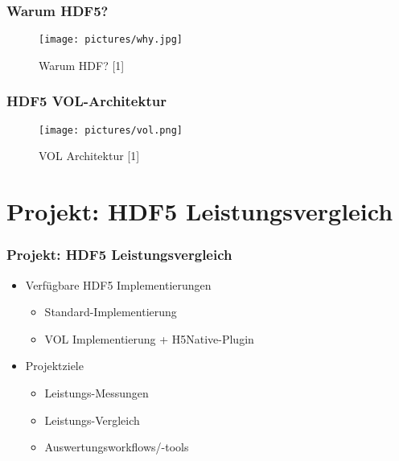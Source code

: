 \begin{frame}
	\frametitle{Warum HDF5?}
	\begin{figure}
		\centering
		\texttt{[image: pictures/why.jpg]}
		\caption*{Warum HDF? [1]}
	\end{figure}
\end{frame}


\begin{frame}
	\frametitle{HDF5 VOL-Architektur}
	\begin{figure}
		\centering
		\texttt{[image: pictures/vol.png]}
		\caption*{VOL Architektur [1]}
	\end{figure}
\end{frame}




\section{Projekt: HDF5 Leistungsvergleich}
\begin{frame}
	\frametitle{Projekt: HDF5 Leistungsvergleich}
	\begin{itemize}
		\item Verfügbare HDF5 Implementierungen
			\begin{itemize}
				\item Standard-Implementierung
				\item VOL Implementierung + H5Native-Plugin
			\end{itemize}
	\end{itemize}

	\begin{itemize}
		\item Projektziele
			\begin{itemize}
				\item Leistungs-Messungen
				\item Leistungs-Vergleich
				\item Auswertungsworkflows/-tools
			\end{itemize}
	\end{itemize}
\end{frame}




